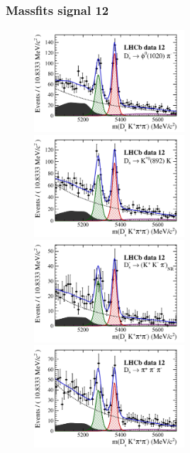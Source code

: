 \documentclass[]{beamer}
\begin{document}
\begin{frame}
\frametitle{Massfits signal 12}

\begin{figure}
\includegraphics[height=!,width=0.5\textwidth]{plots/signal_y12_phipi.pdf}
\includegraphics[height=!,width=0.5\textwidth]{plots/signal_y12_KsK.pdf}\\
\includegraphics[height=!,width=0.5\textwidth]{plots/signal_y12_KKpi_NR.pdf}
\includegraphics[height=!,width=0.5\textwidth]{plots/signal_y12_pipipi.pdf}
\end{figure}

\end{frame}
\end{document}
